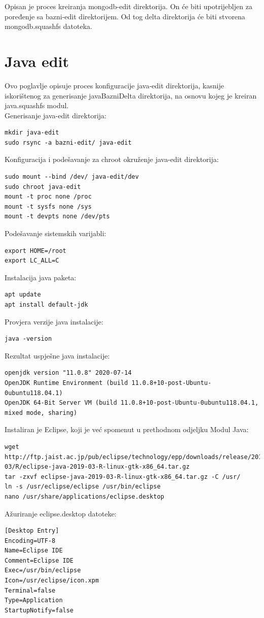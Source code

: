 \documentclass[12pt,vi]{mitthesis}
\begin{document}
Opisan je proces kreiranja mongodb-edit direktorija. On će biti upotrijebljen za poređenje sa bazni-edit direktorijem. Od tog delta direktorija će biti stvorena mongodb.squashfs datoteka.

\section*{Java edit}
\indent
Ovo poglavlje opisuje proces konfiguracije java-edit direktorija, kasnije iskorištenog za generisanje javaBazniDelta direktorija, na osnovu kojeg je kreiran java.squashfs modul.\\
\noindent
Generisanje java-edit direktorija:
\begin{lstlisting}[style=BashInputStyle]
mkdir java-edit
sudo rsync -a bazni-edit/ java-edit
\end{lstlisting}
\noindent
Konfiguracija i podešavanje za chroot okruženje java-edit direktorija:
\begin{lstlisting}[style=BashInputStyle]
sudo mount --bind /dev/ java-edit/dev
sudo chroot java-edit
mount -t proc none /proc
mount -t sysfs none /sys
mount -t devpts none /dev/pts
\end{lstlisting}
\noindent
Podešavanje sistemskih varijabli:
\begin{lstlisting}[style=BashInputStyle]
export HOME=/root
export LC_ALL=C
\end{lstlisting}
\noindent
Instalacija java paketa:
\begin{lstlisting}[style=BashInputStyle]
apt update
apt install default-jdk
\end{lstlisting}
\noindent
Provjera verzije java instalacije:
\begin{lstlisting}[style=BashInputStyle]
java -version
\end{lstlisting}
\noindent
Rezultat uspješne java instalacije:
\begin{lstlisting}[style=BashInputStyle]
openjdk version "11.0.8" 2020-07-14
OpenJDK Runtime Environment (build 11.0.8+10-post-Ubuntu-0ubuntu118.04.1)
OpenJDK 64-Bit Server VM (build 11.0.8+10-post-Ubuntu-0ubuntu118.04.1, mixed mode, sharing)
\end{lstlisting}
\noindent
Instaliran je Eclipse, koji je već spomenut u prethodnom odjeljku Modul Java:
\begin{lstlisting}[style=BashInputStyle]
wget http://ftp.jaist.ac.jp/pub/eclipse/technology/epp/downloads/release/2019-03/R/eclipse-java-2019-03-R-linux-gtk-x86_64.tar.gz
tar -zxvf eclipse-java-2019-03-R-linux-gtk-x86_64.tar.gz -C /usr/
ln -s /usr/eclipse/eclipse /usr/bin/eclipse
nano /usr/share/applications/eclipse.desktop
\end{lstlisting}
Ažuriranje eclipse.desktop datoteke:
\begin{lstlisting}[style=BashInputStyle]
[Desktop Entry]
Encoding=UTF-8
Name=Eclipse IDE
Comment=Eclipse IDE
Exec=/usr/bin/eclipse
Icon=/usr/eclipse/icon.xpm
Terminal=false
Type=Application
StartupNotify=false
\end{lstlisting}
\end{document}

